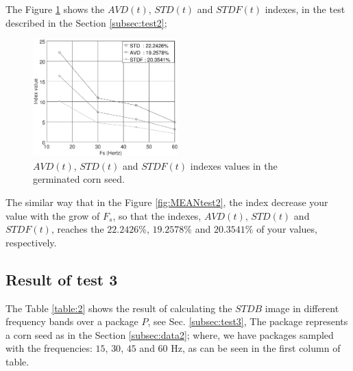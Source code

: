 \documentclass[review]{elsarticle}
\begin{document}
The Figure \ref{fig:INDEXtest2} shows the $AVD(t)$, $STD(t)$ and $STDF(t)$ indexes,
in the test described in the Section \ref{subsec:test2};
\begin{figure}[ht!]
    \centering
    \includegraphics[width=0.5\textwidth]{FPS_Semilla_3_3diasALL.eps}
    \caption{$AVD(t)$, $STD(t)$ and $STDF(t)$ indexes values in the germinated corn seed.}\label{fig:INDEXtest2}
\end{figure}
The similar way that in the Figure \ref{fig:MEANtest2},
the index decrease your value with the grow of $F_s$,
so that the indexes, 
$AVD(t)$, $STD(t)$ and $STDF(t)$, 
reaches the $22.2426\%$, $19.2578\%$ and $20.3541\%$ of your values, 
respectively.


\subsection{Result of test 3}
\label{subsec:resulttest3}
The Table \ref{table:2} shows the result of calculating the $STDB$ image
in different frequency bands over a package $P$, see Sec. \ref{subsec:test3}, 
The package represents  a corn seed as in the Section \ref{subsec:data2};
where, we have packages sampled with the frequencies: $15$, $30$, $45$ and $60$ Hz, as
can be seen in the first column of table.
\end{document}
